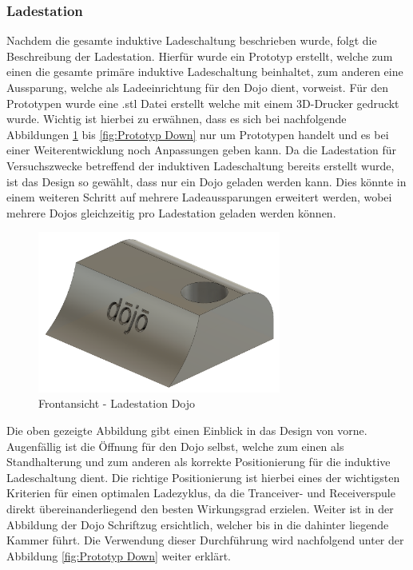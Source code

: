 \subsubsection*{Ladestation}

Nachdem die gesamte induktive Ladeschaltung beschrieben wurde, folgt die Beschreibung der Ladestation. Hierfür wurde ein Prototyp erstellt, welche zum einen die gesamte primäre induktive Ladeschaltung beinhaltet, zum anderen eine Aussparung, welche als Ladeeinrichtung für den Dojo dient, vorweist. Für den Prototypen wurde eine .stl Datei erstellt welche mit einem 3D-Drucker gedruckt wurde. Wichtig ist hierbei zu erwähnen, dass es sich bei nachfolgende Abbildungen \ref{fig:Prototyp Front} bis \ref{fig:Prototyp Down} nur um Prototypen handelt und es bei einer Weiterentwicklung noch Anpassungen geben kann. Da die Ladestation für Versuchszwecke betreffend der induktiven Ladeschaltung bereits erstellt wurde, ist das Design so gewählt, dass nur ein Dojo geladen werden kann. Dies könnte in einem weiteren Schritt auf mehrere Ladeaussparungen erweitert werden, wobei mehrere Dojos gleichzeitig pro Ladestation geladen werden können. 

\begin{figure}[H]
	\begin{center}
		\includegraphics[width=80mm]{data/DojoLadestation01.png}
		\caption[Prototyp Ladestation Frontansicht]{Frontansicht - Ladestation Dojo} %
		\label{fig:Prototyp Front}
	\end{center}
\end{figure}

Die oben gezeigte Abbildung gibt einen Einblick in das Design von vorne. Augenfällig ist die Öffnung für den Dojo selbst, welche zum einen als Standhalterung und zum anderen als korrekte Positionierung für die induktive Ladeschaltung dient. Die richtige Positionierung ist hierbei eines der wichtigsten Kriterien für einen optimalen Ladezyklus, da die Tranceiver- und Receiverspule direkt übereinanderliegend den besten Wirkungsgrad erzielen. Weiter ist in der Abbildung der Dojo Schriftzug ersichtlich, welcher bis in die dahinter liegende Kammer führt. Die Verwendung dieser Durchführung wird nachfolgend unter der Abbildung \ref{fig:Prototyp Down} weiter erklärt. 


